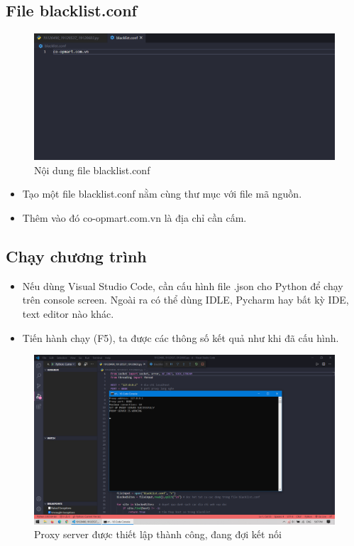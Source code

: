 \documentclass[12pt,a4paper]{article}
\begin{document}
		\subsection{File blacklist.conf}
			\begin{center}
				\begin{figure}[H]
					\begin{center}
						\includegraphics[scale=.49]{images/run_blacklist}
					\end{center}
					\caption{Nội dung file blacklist.conf}
				\end{figure}
			\end{center}
			\begin{itemize}
				\item Tạo một file blacklist.conf nằm cùng thư mục với file mã nguồn.
				\item Thêm vào đó co-opmart.com.vn là địa chỉ cần cấm.
			\end{itemize}
		\subsection{Chạy chương trình}
			\begin{itemize}
				\item Nếu dùng Visual Studio Code, cần cấu hình file .json cho Python để chạy trên console screen. Ngoài ra có thể dùng IDLE, Pycharm hay bất kỳ IDE, text editor nào khác.
				\item Tiến hành chạy (F5), ta được các thông số kết quả như khi đã cấu hình.
			\end{itemize}
			\begin{center}
				\begin{figure}[H]
					\begin{center}
						\includegraphics[scale=.25]{images/run_waiting}
					\end{center}
					\caption{Proxy server được thiết lập thành công, đang đợi kết nối}
				\end{figure}
			\end{center}
\end{document}
